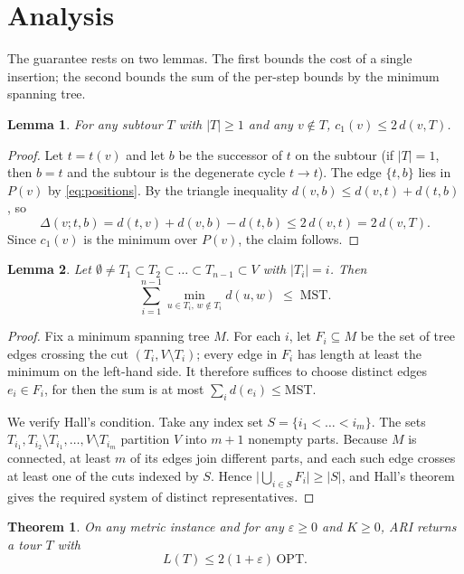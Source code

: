 \documentclass[11pt]{article}
\newtheorem{theorem}{Theorem}
\newtheorem{lemma}{Lemma}
\theoremstyle{definition}
\theoremstyle{remark}
\newcommand{\OPT}{\mathrm{OPT}}
\newcommand{\MST}{\mathrm{MST}}
\begin{document}
\section{Analysis}
\label{sec:analysis}

The guarantee rests on two lemmas. The first bounds the cost of a single insertion; the second bounds the sum of the per-step bounds by the minimum spanning tree.

\begin{lemma}
\label{lem:local}
For any subtour $T$ with $|T| \ge 1$ and any $v \notin T$, $c_1(v) \le 2\, d(v, T)$.
\end{lemma}

\begin{proof}
Let $t = t(v)$ and let $b$ be the successor of $t$ on the subtour (if $|T| = 1$, then $b = t$ and the subtour is the degenerate cycle $t \to t$). The edge $\{t, b\}$ lies in $P(v)$ by \eqref{eq:positions}. By the triangle inequality $d(v, b) \le d(v, t) + d(t, b)$, so
\[
  \Delta(v; t, b) = d(t, v) + d(v, b) - d(t, b) \le 2\, d(v, t) = 2\, d(v, T).
\]
Since $c_1(v)$ is the minimum over $P(v)$, the claim follows.
\end{proof}

\begin{lemma}
\label{lem:cuts}
Let $\emptyset \ne T_1 \subset T_2 \subset \dots \subset T_{n-1} \subset V$ with $|T_i| = i$. Then
\[
  \sum_{i=1}^{n-1} \min_{u \in T_i,\, w \notin T_i} d(u, w) \;\le\; \MST.
\]
\end{lemma}

\begin{proof}
Fix a minimum spanning tree $M$. For each $i$, let $F_i \subseteq M$ be the set of tree edges crossing the cut $(T_i, V \setminus T_i)$; every edge in $F_i$ has length at least the minimum on the left-hand side. It therefore suffices to choose distinct edges $e_i \in F_i$, for then the sum is at most $\sum_i d(e_i) \le \MST$.

We verify Hall's condition. Take any index set $S = \{i_1 < \dots < i_m\}$. The sets $T_{i_1}, T_{i_2} \setminus T_{i_1}, \dots, V \setminus T_{i_m}$ partition $V$ into $m+1$ nonempty parts. Because $M$ is connected, at least $m$ of its edges join different parts, and each such edge crosses at least one of the cuts indexed by $S$. Hence $\bigl|\bigcup_{i \in S} F_i\bigr| \ge |S|$, and Hall's theorem gives the required system of distinct representatives.
\end{proof}

\begin{theorem}
\label{thm:approx}
On any metric instance and for any $\varepsilon \ge 0$ and $K \ge 0$, ARI returns a tour $T$ with
\[
  L(T) \le 2(1 + \varepsilon)\, \OPT.
\]
\end{theorem}
\end{document}
